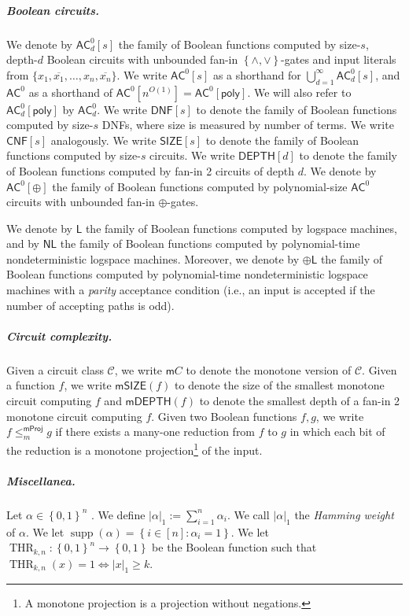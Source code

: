 \documentclass[10pt,a4paper]{article}
\newcommand{\defx}[1]{\emph{#1}}
\DeclareMathOperator{\supp}{supp}
\newcommand{\poly}{\mathsf{poly}}
\newcommand{\complexityfont}[1]{\mathsf{#1}}
\newcommand{\monclass}[1]{\mathsf{m}#1}
\newcommand\NL           {\complexityfont{NL}}
\def\AC           {\complexityfont{AC}}
\def\pL           {\oplus\complexityfont{L}}
\def\SIZE         {\complexityfont{SIZE}}
\def\DEPTH        {\complexityfont{DEPTH}}
\renewcommand{\L} {\complexityfont{L}}
\newcommand{\DNF}{\mathsf{DNF}}
\newcommand{\CNF}{\mathsf{CNF}}
\newcommand{\Cmon}[1]{\mathsf{mSIZE}({#1})}
\newcommand{\mdepth}[1]{\mathsf{mDEPTH}({#1})}
\newcommand{\set}[1]{\left\{#1\right\}}
\newcommand{\card}[1]{\lvert#1\rvert}
\newcommand{\hwt}[1]{\card{#1}_1}
\newcommand{\blt}{\set{0,1}}
\DeclareMathOperator{\thr}{THR}
\newcommand{\xor}{\oplus}
\newcommand{\mprojred}{\leq^{\mathsf{mProj}}_m}
\def\calc{{\mathcal C}}
\begin{document}
    \subparagraph{Boolean circuits.}

    We denote by $\AC^0_d[s]$ 
    the family of Boolean functions computed by
    size-$s$,
    depth-$d$
    Boolean circuits with unbounded fan-in $\set{\land,\lor}$-gates and input literals from $\{x_1, \overline{x_1}, \ldots, x_n, \overline{x_n}\}$.
    We write $\AC^0[s]$ as a shorthand for
    $\bigcup_{d = 1}^\infty \AC^0_d[s]$,
    and $\AC^0$ as a shorthand of $\AC^0[n^{O(1)}] = \AC^0[\poly]$.
    We will also refer to $\AC^0_d[\poly]$
    by $\AC^0_d$.
We write $\DNF[s]$ to denote the family of Boolean functions
    computed by size-$s$ DNFs, where size is measured by  number of terms.
    We write $\CNF[s]$ analogously.
    We write $\SIZE[s]$ to denote
    the family of Boolean functions
    computed by size-$s$ circuits.
    We write $\DEPTH[d]$ to denote
    the family of Boolean functions
    computed by fan-in 2 circuits of depth $d$.
We denote by $\AC^0[\xor]$ the family of Boolean functions computed by
polynomial-size $\AC^0$ circuits with unbounded fan-in $\xor$-gates.

We denote by $\L$ the 
family of
Boolean functions
computed by  logspace machines,
and by $\NL$ the family of Boolean functions
computed by polynomial-time nondeterministic logspace machines.
Moreover, we denote by $\pL$
the family of Boolean functions computed by
polynomial-time nondeterministic logspace machines with a \emph{parity}
acceptance condition (i.e.,
an input is accepted if the number of accepting paths is odd).

\subparagraph{Circuit complexity.}

Given a circuit class $\calc$, we write
    $\monclass{C}$ to denote the
    monotone version of $\calc$.
Given a function $f$, we write $\Cmon{f}$
    to denote the size of the smallest monotone circuit computing
    $f$ and $\mdepth{f}$ to denote the smallest depth of a fan-in 2
    monotone circuit computing $f$.
Given two Boolean functions $f,g$, we write
$f \mprojred g$ if
there exists a many-one reduction from $f$ to $g$
in which each bit of the reduction is a monotone
projection\footnote{A monotone projection is a projection without
negations.}
of the input.

\subparagraph{Miscellanea.}

Let $\alpha \in \blt^n$ .
    We 
    define
    $\hwt{\alpha} := \sum_{i=1}^n \alpha_i$.
    We call $\card{\alpha}_1$ the \defx{Hamming weight} of $\alpha$.
    We let
    $\supp(\alpha) = \set{i \in [n] : \alpha_i = 1}$.
We let $\thr_{k,n} : \blt^n \to \blt$ be the Boolean function
    such that
    $\thr_{k,n}(x) = 1 \iff \hwt{x} \geq k$.
\end{document}

